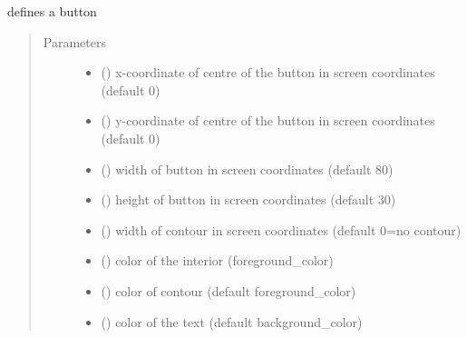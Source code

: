 \documentclass[letterpaper,10pt,english]{sphinxmanual}
\begin{document}

\begin{fulllineitems}
\label{\detokenize{Reference:salabim.AnimateButton}}
defines a button
\begin{quote}\begin{description}
\item[{Parameters}] \leavevmode\begin{itemize}
\item {} 
 () \textendash{} x-coordinate of centre of the button in screen coordinates (default 0)

\item {} 
 () \textendash{} y-coordinate of centre of the button in screen coordinates (default 0)

\item {} 
 () \textendash{} width of button in screen coordinates (default 80)

\item {} 
 () \textendash{} height of button in screen coordinates (default 30)

\item {} 
 () \textendash{} width of contour in screen coordinates (default 0=no contour)

\item {} 
 () \textendash{} color of the interior (foreground\_color)

\item {} 
 () \textendash{} color of contour (default foreground\_color)

\item {} 
 () \textendash{} color of the text (default background\_color)


\end{itemize}
\end{description}
\end{quote}
\end{fulllineitems}
\end{document}
